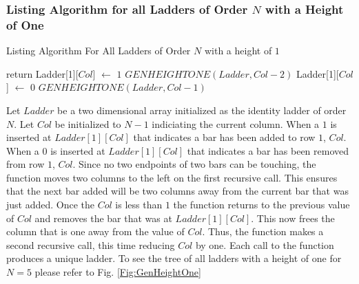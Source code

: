    \subsubsection{Listing Algorithm for all Ladders of Order $N$ with a Height of One}
   \begin{algorithm}
        \caption{Listing Algorithm For All Ladders of Order $N$ with a height of $1$}
        \begin{algorithmic}[1]
                    \State return
                \EndIf
                \State Ladder[1][$Col$] $\gets$ $1$
                \State $GENHEIGHTONE(Ladder, Col-2)$
                \State Ladder[1][$Col$] $\gets$ $0$
                \State $GENHEIGHTONE(Ladder, Col-1)$


            \EndFunction
        \end{algorithmic}    
   \end{algorithm}

   Let $Ladder$ be a two dimensional array initialized as the identity ladder of order $N$. Let $Col$ be initialized to $N-1$ indiciating the 
   current column. When a $1$ is inserted at $Ladder[1][Col]$ that indicates a bar has been added to row $1$, $Col$. When a $0$ is 
   inserted at $Ladder[1][Col]$ that indicates a bar has been removed from row $1$, $Col$. Since no two endpoints of two bars can be touching, 
   the function moves two columns to the 
   left on the first recursive call. This ensures that the next bar added will be two columns away from the current bar that was just added. 
   Once the $Col$ is less than $1$ the function returns to the previous value of $Col$ and removes the bar that was at $Ladder[1][Col]$. 
   This now frees the column that is one away from the  value of $Col$. Thus, the function makes a second recursive call, this time reducing $Col$ by one. 
   Each call to the function produces a unique ladder. To see the tree of all ladders with a height of one for $N=5$ please refer to Fig. 
   \ref{Fig:GenHeightOne}\pagebreak

